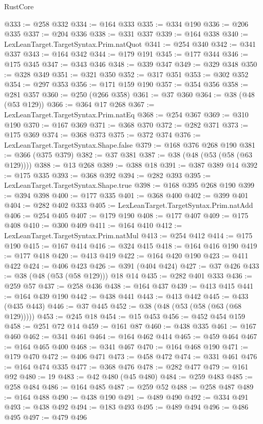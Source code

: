\begin{lexlean}{RustCore}
\begin{coremodule}
@333 := @258 @332
@334 := @164 @333
@335 := @334 @190
@336 := @206 @335
@337 := @204 @336
@338 := @331 @337
@339 := @164 @338
@340 := LexLeanTarget.TargetSyntax.Prim.natQuot
@341 := @254 @340
@342 := @341 @337
@343 := @164 @342
@344 := @179 @191
@345 := @177 @344
@346 := @175 @345
@347 := @343 @346
@348 := @339 @347
@349 := @329 @348
@350 := @328 @349
@351 := @321 @350
@352 := @317 @351
@353 := @302 @352
@354 := @297 @353
@356 := @171 @159 @190
@357 := @354 @356
@358 := @281 @357
@360 := @250 (@266 @358)
@361 := @37 @360
@364 := @38 (@48 (@53 @129))
@366 := @364 @17 @268
@367 := LexLeanTarget.TargetSyntax.Prim.natEq
@368 := @254 @367
@369 := @310 @190
@370 := @167 @369
@371 := @368 @370
@372 := @282 @371
@373 := @175 @369
@374 := @368 @373
@375 := @372 @374
@376 := LexLeanTarget.TargetSyntax.Shape.false
@379 := @168 @376 @268 @190
@381 := @366 (@375 @379)
@382 := @37 @381
@387 := @38 (@48 (@53 (@58 (@63 @129))))
@388 := @13 @268
@389 := @388 @18
@391 := @387 @389 @14
@392 := @175 @335
@393 := @368 @392
@394 := @282 @393
@395 := LexLeanTarget.TargetSyntax.Shape.true
@398 := @168 @395 @268 @190
@399 := @394 @398
@400 := @177 @335
@401 := @368 @400
@402 := @399 @401
@404 := @282 @402 @333
@405 := LexLeanTarget.TargetSyntax.Prim.natAdd
@406 := @254 @405
@407 := @179 @190
@408 := @177 @407
@409 := @175 @408
@410 := @300 @409
@411 := @164 @410
@412 := LexLeanTarget.TargetSyntax.Prim.natMul
@413 := @254 @412
@414 := @175 @190
@415 := @167 @414
@416 := @324 @415
@418 := @164 @416 @190
@419 := @177 @418
@420 := @413 @419
@422 := @164 @420 @190
@423 := @411 @422
@424 := @406 @423
@426 := @391 (@404 @424)
@427 := @37 @426
@433 := @38 (@48 (@53 (@58 @129))) @18 @14
@435 := @282 @401 @333
@436 := @259 @57
@437 := @258 @436
@438 := @164 @437
@439 := @413 @415
@441 := @164 @439 @190
@442 := @438 @441
@443 := @413 @442
@445 := @433 (@435 @443)
@446 := @37 @445
@452 := @38 (@48 (@53 (@58 (@63 (@68 @129)))))
@453 := @245 @18
@454 := @15 @453
@456 := @452 @454 @159
@458 := @251 @72 @14
@459 := @161 @87
@460 := @438 @335
@461 := @167 @460
@462 := @341 @461
@464 := @164 @462 @414
@465 := @459 @464
@467 := @164 @465 @400
@468 := @341 @467
@470 := @164 @468 @190
@471 := @179 @470
@472 := @406 @471
@473 := @458 @472
@474 := @331 @461
@476 := @164 @474 @335
@477 := @368 @476
@478 := @282 @477
@479 := @161 @92
@480 := 19
@483 := @42 @480 (@45 @480)
@484 := @259 @483
@485 := @258 @484
@486 := @164 @485
@487 := @259 @52
@488 := @258 @487
@489 := @164 @488
@490 := @438 @190
@491 := @489 @490
@492 := @334 @491
@493 := @438 @492
@494 := @183 @493
@495 := @489 @494
@496 := @486 @495
@497 := @479 @496

\end{coremodule}
\end{lexlean}
